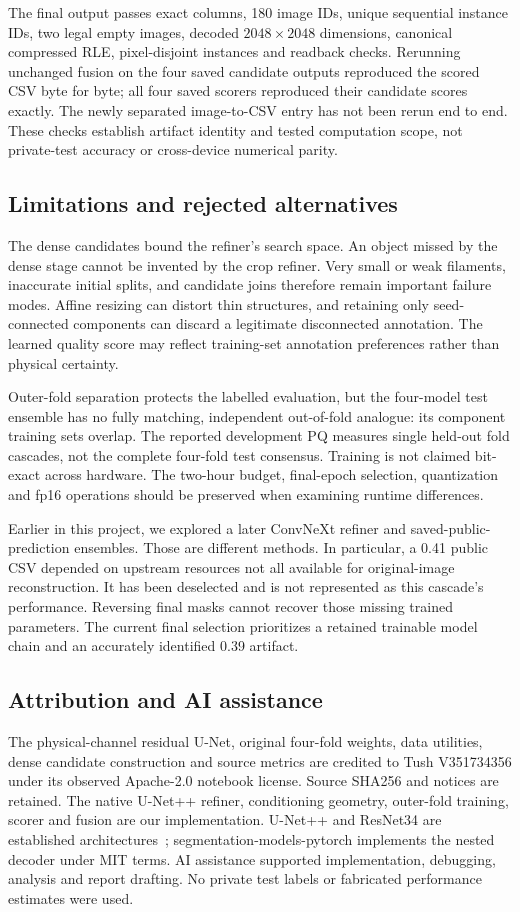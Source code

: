 \documentclass[sigconf]{acmart}
\begin{document}
The final output passes exact columns, 180 image IDs, unique sequential instance IDs, two legal empty images, decoded $2048\times2048$ dimensions, canonical compressed RLE, pixel-disjoint instances and readback checks. Rerunning unchanged fusion on the four saved candidate outputs reproduced the scored CSV byte for byte; all four saved scorers reproduced their candidate scores exactly. The newly separated image-to-CSV entry has not been rerun end to end. These checks establish artifact identity and tested computation scope, not private-test accuracy or cross-device numerical parity.

\subsection{Limitations and rejected alternatives}
The dense candidates bound the refiner's search space. An object missed by the dense stage cannot be invented by the crop refiner. Very small or weak filaments, inaccurate initial splits, and candidate joins therefore remain important failure modes. Affine resizing can distort thin structures, and retaining only seed-connected components can discard a legitimate disconnected annotation. The learned quality score may reflect training-set annotation preferences rather than physical certainty.

Outer-fold separation protects the labelled evaluation, but the four-model test ensemble has no fully matching, independent out-of-fold analogue: its component training sets overlap. The reported development PQ measures single held-out fold cascades, not the complete four-fold test consensus. Training is not claimed bit-exact across hardware. The two-hour budget, final-epoch selection, quantization and fp16 operations should be preserved when examining runtime differences.

Earlier in this project, we explored a later ConvNeXt refiner and saved-public-prediction ensembles. Those are different methods. In particular, a 0.41 public CSV depended on upstream resources not all available for original-image reconstruction. It has been deselected and is not represented as this cascade's performance. Reversing final masks cannot recover those missing trained parameters. The current final selection prioritizes a retained trainable model chain and an accurately identified 0.39 artifact.

\subsection{Attribution and AI assistance}
The physical-channel residual U-Net, original four-fold weights, data utilities, dense candidate construction and source metrics are credited to Tush V351734356 under its observed Apache-2.0 notebook license. Source SHA256 and notices are retained. The native U-Net++ refiner, conditioning geometry, outer-fold training, scorer and fusion are our implementation. U-Net++ and ResNet34 are established architectures~\cite{unetpp2018,resnet2016}; segmentation-models-pytorch implements the nested decoder under MIT terms. AI assistance supported implementation, debugging, analysis and report drafting. No private test labels or fabricated performance estimates were used.
\end{document}

